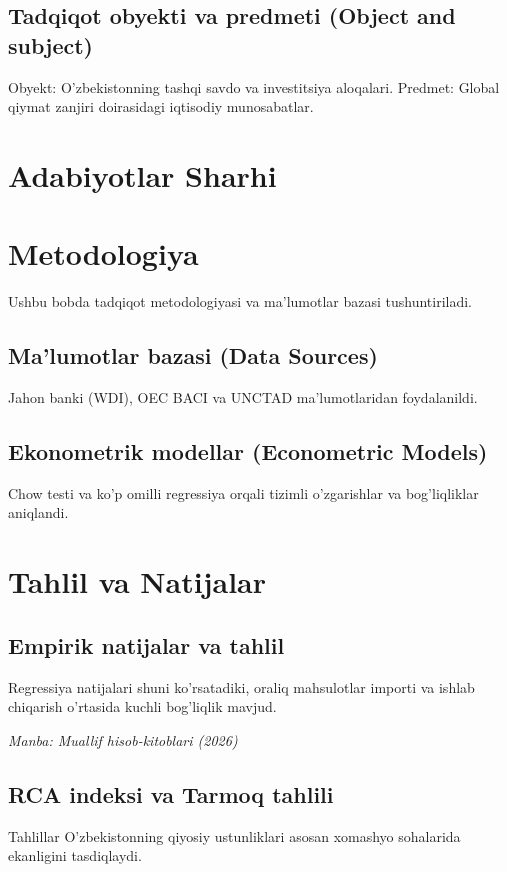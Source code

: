 \documentclass[14pt,a4paper]{extarticle}
\newcommand{\manba}[1]{\vspace{6pt}\par\noindent\fontsize{10}{12}\selectfont\textit{Manba: #1}}
\begin{document}
\subsection{Tadqiqot obyekti va predmeti (Object and subject)}
Obyekt: O'zbekistonning tashqi savdo va investitsiya aloqalari. Predmet: Global qiymat zanjiri doirasidagi iqtisodiy munosabatlar.

\newpage
\section{Adabiyotlar Sharhi}


\newpage
\section{Metodologiya}
Ushbu bobda tadqiqot metodologiyasi va ma'lumotlar bazasi tushuntiriladi.
\subsection{Ma'lumotlar bazasi (Data Sources)}
Jahon banki (WDI), OEC BACI va UNCTAD ma'lumotlaridan foydalanildi.
\subsection{Ekonometrik modellar (Econometric Models)}
Chow testi va ko'p omilli regressiya orqali tizimli o'zgarishlar va bog'liqliklar aniqlandi.

\newpage
\section{Tahlil va Natijalar}
\subsection{Empirik natijalar va tahlil}
Regressiya natijalari shuni ko'rsatadiki, oraliq mahsulotlar importi va ishlab chiqarish o'rtasida kuchli bog'liqlik mavjud.



\manba{Muallif hisob-kitoblari (2026)}

\subsection{RCA indeksi va Tarmoq tahlili}
Tahlillar O'zbekistonning qiyosiy ustunliklari asosan xomashyo sohalarida ekanligini tasdiqlaydi.
\end{document}
